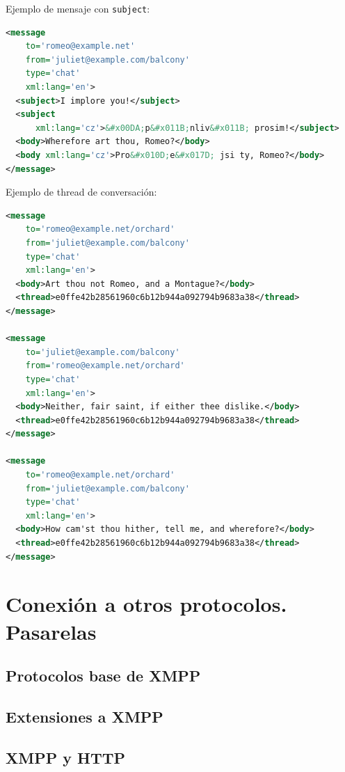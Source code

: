 \documentclass[a4paper, 11pt]{article} %
\begin{document}
      Ejemplo de mensaje con \texttt{subject}:
\begin{lstlisting}[language=XML]  
<message
    to='romeo@example.net'
    from='juliet@example.com/balcony'
    type='chat'
    xml:lang='en'>
  <subject>I implore you!</subject>
  <subject
      xml:lang='cz'>&#x00DA;p&#x011B;nliv&#x011B; prosim!</subject>
  <body>Wherefore art thou, Romeo?</body>
  <body xml:lang='cz'>Pro&#x010D;e&#x017D; jsi ty, Romeo?</body>
</message> 
\end{lstlisting}
  
      Ejemplo de thread de conversación:
\begin{lstlisting}[language=XML]        
<message
    to='romeo@example.net/orchard'
    from='juliet@example.com/balcony'
    type='chat'
    xml:lang='en'>
  <body>Art thou not Romeo, and a Montague?</body>
  <thread>e0ffe42b28561960c6b12b944a092794b9683a38</thread>
</message>

<message
    to='juliet@example.com/balcony'
    from='romeo@example.net/orchard'
    type='chat'
    xml:lang='en'>
  <body>Neither, fair saint, if either thee dislike.</body>
  <thread>e0ffe42b28561960c6b12b944a092794b9683a38</thread>
</message>

<message
    to='romeo@example.net/orchard'
    from='juliet@example.com/balcony'
    type='chat'
    xml:lang='en'>
  <body>How cam'st thou hither, tell me, and wherefore?</body>
  <thread>e0ffe42b28561960c6b12b944a092794b9683a38</thread>
</message>

\end{lstlisting}

      
\section{Conexión a otros protocolos. Pasarelas}
  \subsection{Protocolos base de XMPP}
  \subsection{Extensiones a XMPP}
  \subsection{XMPP y HTTP}
  
  
\end{document}
